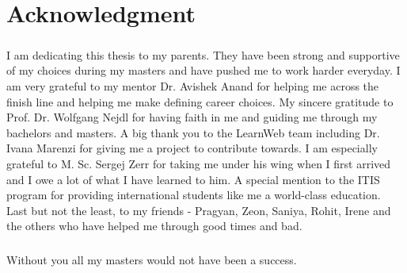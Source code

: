 \chapter{Acknowledgment}

\paragraph{} %
\label{par:}
I am dedicating this thesis to my parents. They have been strong and supportive
of my choices during my masters and have pushed me to work harder everyday. I am 
very grateful to my mentor Dr. Avishek Anand for helping me across the finish line
and helping me make defining career choices. My sincere gratitude to Prof. Dr. Wolfgang Nejdl
for having faith in me and guiding me through my bachelors and masters. A big thank you to
the LearnWeb team including Dr. Ivana Marenzi for giving me a project to contribute towards.
I am especially grateful to M. Sc. Sergej Zerr for taking me under his wing when I first arrived and 
I owe a lot of what I have learned to him. A special mention to the ITIS program for
providing international students like me a world-class education.
Last but not the least, to my friends - Pragyan, Zeon, Saniya, Rohit, Irene
and the others who have helped me through good times and bad. 

\paragraph{}

Without you all my masters would not have been a success. 

